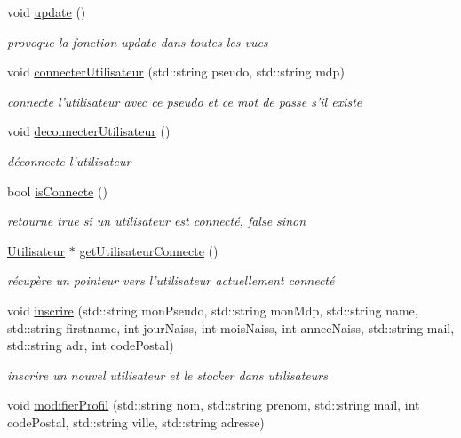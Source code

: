 \begin{DoxyCompactItemize}
void \hyperlink{class_gestion_bdd_a518211afbda535f9bcbf718254c7a6aa}{update} ()
\begin{DoxyCompactList}\small\item\em provoque la fonction update dans toutes les vues \end{DoxyCompactList}\item 
void \hyperlink{class_gestion_bdd_a936ae71d7145692ec01ccb0f282d3b59}{connecter\-Utilisateur} (std\-::string pseudo, std\-::string mdp)
\begin{DoxyCompactList}\small\item\em connecte l'utilisateur avec ce pseudo et ce mot de passe s'il existe \end{DoxyCompactList}\item 
void \hyperlink{class_gestion_bdd_a0e99ded45980647e925295e8cd828004}{deconnecter\-Utilisateur} ()
\begin{DoxyCompactList}\small\item\em déconnecte l'utilisateur \end{DoxyCompactList}\item 
bool \hyperlink{class_gestion_bdd_a86ee63900b31ef17bf487ebc1abe8634}{is\-Connecte} ()
\begin{DoxyCompactList}\small\item\em retourne true si un utilisateur est connecté, false sinon \end{DoxyCompactList}\item 
\hyperlink{class_utilisateur}{Utilisateur} $\ast$ \hyperlink{class_gestion_bdd_a2ca66731bc3b85a279d5b140e63ba838}{get\-Utilisateur\-Connecte} ()
\begin{DoxyCompactList}\small\item\em récupère un pointeur vers l'utilisateur actuellement connecté \end{DoxyCompactList}\item 
void \hyperlink{class_gestion_bdd_a02f362c2dd2ca487922e00988f71281b}{inscrire} (std\-::string mon\-Pseudo, std\-::string mon\-Mdp, std\-::string name, std\-::string firstname, int jour\-Naiss, int mois\-Naiss, int annee\-Naiss, std\-::string mail, std\-::string adr, int code\-Postal)
\begin{DoxyCompactList}\small\item\em inscrire un nouvel utilisateur et le stocker dans utilisateurs \end{DoxyCompactList}\item 
void \hyperlink{class_gestion_bdd_a966846d69aa1cf0ed82ef74127e10883}{modifier\-Profil} (std\-::string nom, std\-::string prenom, std\-::string mail, int code\-Postal, std\-::string ville, std\-::string adresse)

\end{DoxyCompactItemize}
